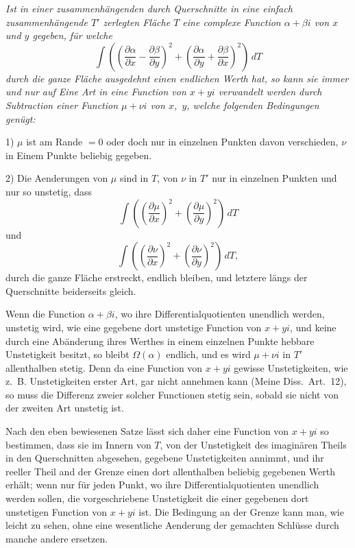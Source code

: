 \documentclass[a4paper,12pt,leqno]{article}
\begin{document}
{\itshape
\label{`Bestimmung'}
Ist in einer zusammenh\"{a}ngenden durch Querschnitte
in eine einfach zusammenh\"{a}ngende $T'$ zerlegten Fl\"{a}che
$T$ eine complexe Function $\alpha + \beta i$ von $x$ und $y$
gegeben, f\"{u}r welche
\[ \int  \left(
            \left(
               \frac{\partial \alpha}{\partial x}
             - \frac{\partial \beta}{\partial y}
            \right)^2
          + \left(
               \frac{\partial \alpha}{\partial y}
             + \frac{\partial \beta}{\partial x}
            \right)^2
         \right) \, dT \]
durch die ganze Fl\"{a}che ausgedehnt einen endlichen Werth hat,
so kann sie immer und nur auf Eine Art in eine Function von
$x + yi$ verwandelt werden durch Subtraction einer Function
$\mu + \nu i$ von $x$,~$y$, welche folgenden Bedingungen
gen\"{u}gt:

1) $\mu$ ist am Rande $= 0$ oder doch nur in einzelnen Punkten
davon verschieden, $\nu$ in Einem Punkte beliebig gegeben.

2) Die Aenderungen von $\mu$ sind in $T$, von $\nu$ in $T'$ nur
in einzelnen Punkten und nur so unstetig, dass
\[ \int  \left(
            \left( \frac{\partial \mu}{\partial x} \right)^2
          + \left( \frac{\partial \mu}{\partial y} \right)^2
         \right) \, dT \]
und
\[ \int  \left(
            \left( \frac{\partial \nu}{\partial x} \right)^2
          + \left( \frac{\partial \nu}{\partial y} \right)^2
         \right) \, dT,\]
durch die ganze Fl\"{a}che erstreckt, endlich bleiben, und
letztere l\"{a}ngs der Querschnitte beiderseits gleich.}

Wenn die Function $\alpha + \beta i$, wo ihre
Differentialquotienten unendlich werden, unstetig wird, wie eine
gegebene dort unstetige Function von $x + yi$, und keine durch
eine Ab\"{a}nderung ihres Werthes in einem einzelnen Punkte
hebbare Unstetigkeit besitzt, so bleibt $\Omega(\alpha)$ endlich,
und es wird $\mu + \nu i$ in $T'$ allenthalben stetig.  Denn da
eine Function von $x + yi$ gewisse Unstetigkeiten, wie z.~B.
Unstetigkeiten erster Art, gar nicht annehmen kann
(Meine Diss.\ Art.\ 12), so muss die Differenz zweier solcher
Functionen stetig sein, sobald sie nicht von der zweiten Art
unstetig ist.

Nach den eben bewiesenen Satze l\"{a}sst sich daher eine Function
von $x + yi$ so bestimmen, dass sie im Innern von $T$, von der
Unstetigkeit des imagin\"{a}ren Theils in den Querschnitten
abgesehen, gegebene Unstetigkeiten annimmt, und ihr reeller Theil
and der Grenze einen dort allenthalben beliebig gegebenen Werth
erh\"{a}lt; wenn nur f\"{u}r jeden Punkt, wo ihre
Differentialquotienten unendlich werden sollen, die
vorgeschriebene Unstetigkeit die einer gegebenen dort unstetigen
Function von $x + yi$ ist.  Die Bedingung an der Grenze kann man,
wie leicht zu sehen, ohne eine wesentliche Aenderung der
gemachten Schl\"{u}sse durch manche andere ersetzen.
\end{document}
